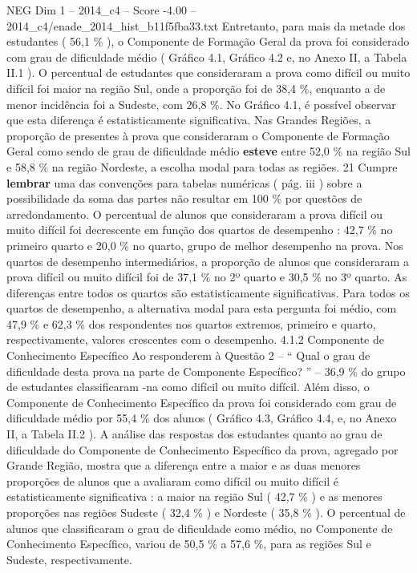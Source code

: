 \begin{textsample}{NEG Dim 1 – 2014\_c4 – Score -4.00 – 2014\_c4/enade\_2014\_hist\_b11f5fba33.txt}
Entretanto, para mais da metade dos estudantes ( 56,1 \% ), o Componente de Formação Geral da prova foi considerado com grau de dificuldade médio ( Gráfico 4.1, Gráfico 4.2 e, no Anexo II, a Tabela II.1 ).
O percentual de estudantes que consideraram a prova como difícil ou muito difícil foi maior na região Sul, onde a proporção foi de 38,4 \%, enquanto a de menor incidência foi a Sudeste, com 26,8 \%.
No Gráfico 4.1, é possível observar que esta diferença é estatisticamente significativa.
Nas Grandes Regiões, a proporção de presentes à prova que consideraram o Componente de Formação Geral como sendo de grau de dificuldade médio \textbf{esteve} entre 52,0 \% na região Sul e 58,8 \% na região Nordeste, a escolha modal para todas as regiões. 21 Cumpre \textbf{lembrar} uma das convenções para tabelas numéricas ( pág. iii ) sobre a possibilidade da soma das partes não resultar em 100 \% por questões de arredondamento.
O percentual de alunos que consideraram a prova difícil ou muito difícil foi decrescente em função dos quartos de desempenho : 42,7 \% no primeiro quarto e 20,0 \% no quarto, grupo de melhor desempenho na prova.
Nos quartos de desempenho intermediários, a proporção de alunos que consideraram a prova difícil ou muito difícil foi de 37,1 \% no 2º quarto e 30,5 \% no 3º quarto.
As diferenças entre todos os quartos são estatisticamente significativas.
Para todos os quartos de desempenho, a alternativa modal para esta pergunta foi médio, com 47,9 \% e 62,3 \% dos respondentes nos quartos extremos, primeiro e quarto, respectivamente, valores crescentes com o desempenho. 4.1.2 Componente de Conhecimento Específico Ao responderem à Questão 2 – “ Qual o grau de dificuldade desta prova na parte de Componente Específico? ” – 36,9 \% do grupo de estudantes classificaram -na como difícil ou muito difícil.
Além disso, o Componente de Conhecimento Específico da prova foi considerado com grau de dificuldade médio por 55,4 \% dos alunos ( Gráfico 4.3, Gráfico 4.4, e, no Anexo II, a Tabela II.2 ).
A análise das respostas dos estudantes quanto ao grau de dificuldade do Componente de Conhecimento Específico da prova, agregado por Grande Região, mostra que a diferença entre a maior e as duas menores proporções de alunos que a avaliaram como difícil ou muito difícil é estatisticamente significativa : a maior na região Sul ( 42,7 \% ) e as menores proporções nas regiões Sudeste ( 32,4 \% ) e Nordeste ( 35,8 \% ).
O percentual de alunos que classificaram o grau de dificuldade como médio, no Componente de Conhecimento Específico, variou de 50,5 \% a 57,6 \%, para as regiões Sul e Sudeste, respectivamente.

\end{textsample}
